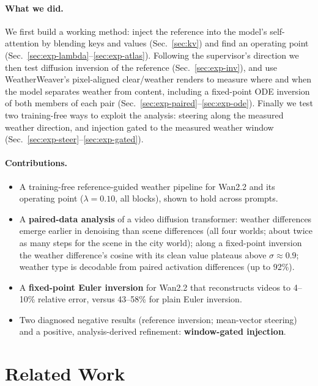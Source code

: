 \documentclass[11pt,a4paper]{article}
\newcommand{\lam}{\lambda}
\begin{document}
\paragraph{What we did.}
We first build a working method: inject the reference into the model's self-attention by blending keys and values (Sec.~\ref{sec:kv}) and find an operating point (Sec.~\ref{sec:exp-lambda}--\ref{sec:exp-atlas}).
Following the supervisor's direction we then test diffusion inversion of the reference (Sec.~\ref{sec:exp-inv}), and use WeatherWeaver's pixel-aligned clear/weather renders to measure where and when the model separates weather from content, including a fixed-point ODE inversion of both members of each pair (Sec.~\ref{sec:exp-paired}--\ref{sec:exp-ode}).
Finally we test two training-free ways to exploit the analysis: steering along the measured weather direction, and injection gated to the measured weather window (Sec.~\ref{sec:exp-steer}--\ref{sec:exp-gated}).

\paragraph{Contributions.}
\begin{itemize}
  \item A training-free reference-guided weather pipeline for Wan2.2 and its operating point ($\lam{=}0.10$, all blocks), shown to hold across prompts.
  \item A \textbf{paired-data analysis} of a video diffusion transformer: weather differences emerge earlier in denoising than scene differences (all four worlds; about twice as many steps for the scene in the city world); along a fixed-point inversion the weather difference's cosine with its clean value plateaus above $\sigma{\approx}0.9$; weather type is decodable from paired activation differences (up to 92\%).
  \item A \textbf{fixed-point Euler inversion} for Wan2.2 that reconstructs videos to 4--10\% relative error, versus 43--58\% for plain Euler inversion.
  \item Two diagnosed negative results (reference inversion; mean-vector steering) and a positive, analysis-derived refinement: \textbf{window-gated injection}.
\end{itemize}

\section{Related Work}
\end{document}
